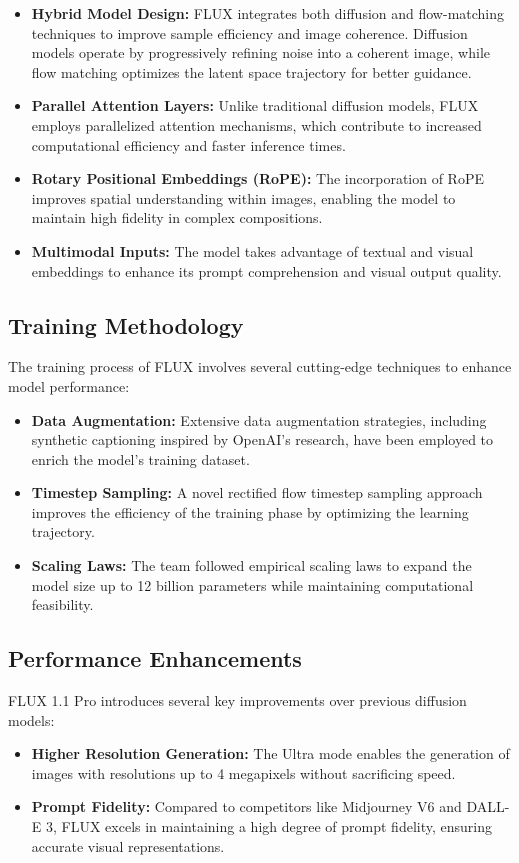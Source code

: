 \begin{itemize}
    \item \textbf{Hybrid Model Design:} FLUX integrates both diffusion and flow-matching techniques to improve sample efficiency and image coherence. Diffusion models operate by progressively refining noise into a coherent image, while flow matching optimizes the latent space trajectory for better guidance.
    \item \textbf{Parallel Attention Layers:} Unlike traditional diffusion models, FLUX employs parallelized attention mechanisms, which contribute to increased computational efficiency and faster inference times.
    \item \textbf{Rotary Positional Embeddings (RoPE):} The incorporation of RoPE improves spatial understanding within images, enabling the model to maintain high fidelity in complex compositions.
    \item \textbf{Multimodal Inputs:} The model takes advantage of textual and visual embeddings to enhance its prompt comprehension and visual output quality.
\end{itemize}

\subsection{Training Methodology}
The training process of FLUX involves several cutting-edge techniques to enhance model performance:

\begin{itemize}
    \item \textbf{Data Augmentation:} Extensive data augmentation strategies, including synthetic captioning inspired by OpenAI's research, have been employed to enrich the model's training dataset.
    \item \textbf{Timestep Sampling:} A novel rectified flow timestep sampling approach improves the efficiency of the training phase by optimizing the learning trajectory.
    \item \textbf{Scaling Laws:} The team followed empirical scaling laws to expand the model size up to 12 billion parameters while maintaining computational feasibility.
\end{itemize}

\subsection{Performance Enhancements}
FLUX 1.1 Pro introduces several key improvements over previous diffusion models:

\begin{itemize}
    \item \textbf{Higher Resolution Generation:} The Ultra mode enables the generation of images with resolutions up to 4 megapixels without sacrificing speed.
    \item \textbf{Prompt Fidelity:} Compared to competitors like Midjourney V6 and DALL-E 3, FLUX excels in maintaining a high degree of prompt fidelity, ensuring accurate visual representations.
\end{itemize}
